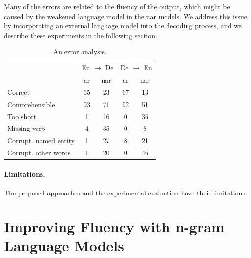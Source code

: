 Many of the errors are related to the fluency of the output, which might be
caused by the weakened language model in the \ac{nar} models. We address this
issue by incorporating an external language model into the decoding process,
and we describe these experiments in the following section.

\begin{table}
  \centering
  \begin{tabular}{lcccc}
    \toprule
    & \multicolumn{2}{c}{En $\rightarrow$ De} & \multicolumn{2}{c}{De $\rightarrow$ En} \\
    & \acs{ar} & \acs{nar} & \acs{ar} & \acs{nar} \\
    \midrule
    Correct        & 65 & 23 & 67 & 13 \\
    Comprehensible & 93 & 71 & 92 & 51 \\
    \midrule
    Too short      & 1 & 16 & 0 & 36 \\
    Missing verb   & 4 & 35 & 0 & 8 \\
    Corrupt. named entity   & 1 & 27 & 8 & 21 \\
    Corrupt. other words & 1 & 20 & 0 & 46 \\
    \bottomrule
  \end{tabular}

  \caption{An error analysis. }%
  \label{tab:end-to-end:error-analysis}

\end{table}


\paragraph{Limitations.} The proposed approaches and the experimental
evaluation have their limitations. 

\section{Improving Fluency with n-gram Language Models}%
\label{sec:ctc:fluency}


\noindent



